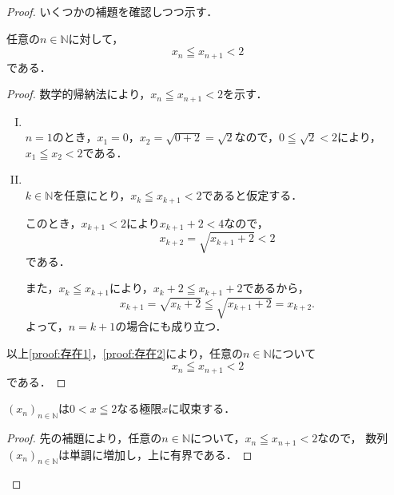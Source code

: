 \documentclass[a4paper,11pt]{ltjsarticle}
\newenvironment{tleftbar}{\begin{tbleftline}\setlength{\parindent}{1\zw}}{\end{tbleftline}}
\newenvironment{dotleftbar}{%
  \begin{tbdotleftline}\setlength{\parindent}{1\zw}%
}{%
  \end{tbdotleftline}%
}
\begin{document}
\begin{tleftbar}
  \begin{proof}
    いくつかの補題を確認しつつ示す．
    \begin{lemma}{}{}
      任意の$n \in \mathbb{N}$に対して，
      \[
        x_n \leqq x_{n+1} < 2
      \]
      である．
    \end{lemma}

    \begin{dotleftbar}
      \begin{proof}
        数学的帰納法により，$x_n \leqq x_{n+1} < 2$を示す．
        \begin{enumerate}[(I)]
          \item \mbox{} \\ \label{proof:存在1}
                $n=1$のとき，$ x_1 =0$，$x_2= \sqrt{0+2}=\sqrt{2}$なので，$ 0 \leqq \sqrt{2} < 2$により，
                $x_1 \leqq x_2 < 2$である．
          \item \mbox{} \\ \label{proof:存在2}
                $k \in \mathbb{N}$を任意にとり，$x_k \leqq x_{k+1} < 2$であると仮定する．

                このとき，$x_{k+1} < 2$により$ x_{k+1}+2 < 4$なので，
                \[
                  x_{k+2}=\sqrt{x_{k+1} + 2} < 2
                \]
                である．

                また，$x_k \leqq x_{k+1}$により，$x_k +2  \leqq x_{k+1}+2$であるから，
                \[
                  x_{k+1}= \sqrt{x_k +2} \leqq \sqrt{x_{k+1}+2}=x_{k+2}.
                \]
                よって，$n=k+1$の場合にも成り立つ．
        \end{enumerate}
        以上\ref{proof:存在1}，\ref{proof:存在2}により，任意の$n \in \mathbb{N}$について
        \[
          x_n \leqq x_{n+1} < 2
        \]
        である．
      \end{proof}
    \end{dotleftbar}

    \begin{lemma}{}{}
      $(x_n)_{n \in \mathbb{N}}$は$ 0<  x \leqq 2$なる極限$x$に収束する．
    \end{lemma}

    \begin{dotleftbar}
      \begin{proof}
        先の補題により，任意の$n \in \mathbb{N}$について，$ x_n \leqq x_{n+1} <2$なので，
        数列$(x_n)_{n \in \mathbb{N}}$は単調に増加し，上に有界である．


\end{proof}
\end{dotleftbar}
\end{proof}
\end{tleftbar}
\end{document}
